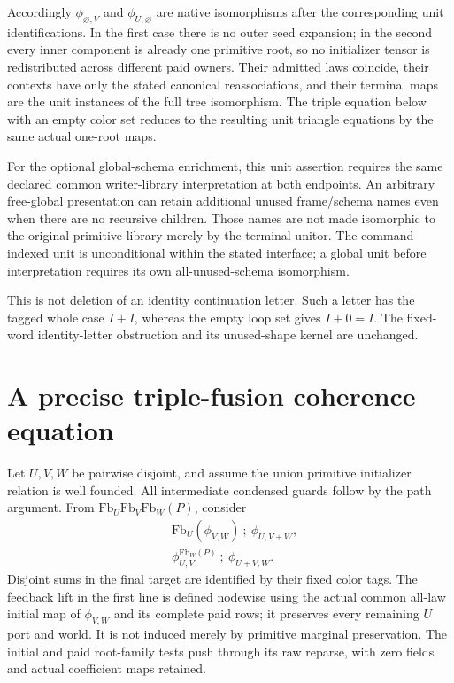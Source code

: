 \documentclass[11pt]{article}\usepackage{amsmath,amssymb,amsthm,geometry}\geometry{margin=1in}\newtheorem{lemma}{Lemma}\newtheorem{theorem}[lemma]{Theorem}
\begin{document}
Accordingly $\phi_{\varnothing,V}$ and $\phi_{U,\varnothing}$ are native isomorphisms after the corresponding unit identifications. In the first case there is no outer seed expansion; in the second every inner component is already one primitive root, so no initializer tensor is redistributed across different paid owners. Their admitted laws coincide, their contexts have only the stated canonical reassociations, and their terminal maps are the unit instances of the full tree isomorphism. The triple equation below with an empty color set reduces to the resulting unit triangle equations by the same actual one-root maps.

For the optional global-schema enrichment, this unit assertion requires the same declared common writer-library interpretation at both endpoints. An arbitrary free-global presentation can retain additional unused frame/schema names even when there are no recursive children. Those names are not made isomorphic to the original primitive library merely by the terminal unitor. The command-indexed unit is unconditional within the stated interface; a global unit before interpretation requires its own all-unused-schema isomorphism.

This is not deletion of an identity continuation letter. Such a letter has the tagged whole case $I+I$, whereas the empty loop set gives $I+0=I$. The fixed-word identity-letter obstruction and its unused-shape kernel are unchanged.

\section{A precise triple-fusion coherence equation}
Let $U,V,W$ be pairwise disjoint, and assume the union primitive initializer relation is well founded. All intermediate condensed guards follow by the path argument. From $\mathrm{Fb}_U\mathrm{Fb}_V\mathrm{Fb}_W(P)$, consider
\[
\begin{split}
 &\mathrm{Fb}_U(\phi_{V,W})\ ;\ \phi_{U,V+W},\\
 &\phi^{\mathrm{Fb}_W(P)}_{U,V}\ ;\ \phi_{U+V,W}.       \tag{3}
\end{split}
\]
Disjoint sums in the final target are identified by their fixed color tags. The feedback lift in the first line is defined nodewise using the actual common all-law initial map of $\phi_{V,W}$ and its complete paid rows; it preserves every remaining $U$ port and world. It is not induced merely by primitive marginal preservation. The initial and paid root-family tests push through its raw reparse, with zero fields and actual coefficient maps retained.
\end{document}
